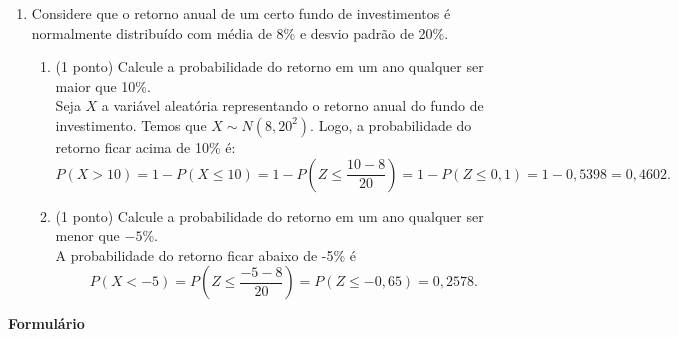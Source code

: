\documentclass{article}
\begin{document}
\begin{enumerate}
\begin{enumerate}
	\item (1 ponto) Calcule a probabilidade do número de chamadas ficar acima da média.\\
	{\color{blue}
	Temos que a média é $E(X) = 2$. Logo, a probabilidade do número de chamadas ficar acima da média é
	\begin{align*}
	P(X > E(X)) &= P(X>2) = 1 - P(X\leq 2)
	= 1 - P(X=0) - P(X=1) - P(X=2)\\
	&= 1 - e^{-2} - 2e^{-2} - 2e^{-2} \approx 0,32.
	\end{align*}
	}
\end{enumerate}

\item Considere que o retorno anual de um certo fundo de investimentos é normalmente distribuído com média de 8\% e desvio padrão de 20\%.
\begin{enumerate}
  	\item (1 ponto) Calcule a probabilidade do retorno em um ano qualquer ser maior que 10\%.\\
	{\color{blue}
	Seja $X$ a variável aleatória representando o retorno anual do fundo de investimento. Temos que $X\sim N(8, 20^2)$. Logo, a probabilidade do retorno ficar acima de 10\% é:
	$$
	P(X > 10) = 1 - P(X\leq 10) = 1 - P\left( Z \leq \frac{10-8}{20} \right)
	= 1 - P(Z \leq 0,1)
	= 1 - 0,5398
	= 0,4602.
	$$
	}
	
   	\item (1 ponto) Calcule a probabilidade do retorno em um ano qualquer ser menor que $-5$\%.\\
	{\color{blue}
	A probabilidade do retorno ficar abaixo de -5\% é
	$$
	P(X<-5) = P\left( Z \leq \frac{-5-8}{20} \right)
	= P(Z \leq -0,65)
	= 0,2578.
	$$
	}
\end{enumerate} 


    
\end{enumerate}



\vspace{2cm}

\newpage
\begin{center}
	\Large{\textbf{Formulário}}
\end{center}
\end{document}
